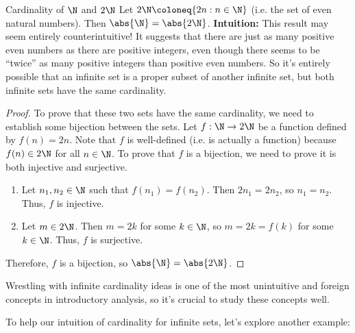 \begin{exbox}{Cardinality of $\N$ and $2\N$}{}
    Let $2\N \coloneq \{ 2n : n \in \N \}$ (i.e. the set of even natural numbers). Then $\abs{\N} = \abs{2\N}$.
    \tcblower
    \textbf{Intuition:} This result may seem entirely counterintuitive! It suggests that there are just as many positive even numbers as there are positive integers, even though there seems to be ``twice'' as many positive integers than positive even numbers. So it's entirely possible that an infinite set is a proper subset of another infinite set, but both infinite sets have the same cardinality.
    \begin{proof}
        To prove that these two sets have the same cardinality, we need to establish some bijection between the sets. Let $f : \N \to 2\N$ be a function defined by $f(n) = 2n$. Note that $f$ is well-defined (i.e. is actually a function) because $f(n) \in 2 \N$ for all $n \in \N$. To prove that $f$ is a bijection, we need to prove it is both injective and surjective.
        \begin{enumerate}
            \item Let $n_1, n_2 \in \N$ such that $f(n_1) = f(n_2)$. Then $2n_1 = 2n_2$, so $n_1 = n_2$. Thus, $f$ is injective.
            \item Let $m \in 2\N$. Then $m = 2k$ for some $k \in \N$, so $m = 2k = f(k)$ for some $k \in \N$. Thus, $f$ is surjective.
        \end{enumerate}
        Therefore, $f$ is a bijection, so $\abs{\N} = \abs{2\N}$.
    \end{proof}
\end{exbox}

\begin{notebox}
    Wrestling with infinite cardinality ideas is one of the most unintuitive and foreign concepts in introductory analysis, so it's crucial to study these concepts well.
\end{notebox}

To help our intuition of cardinality for infinite sets, let's explore another example:

